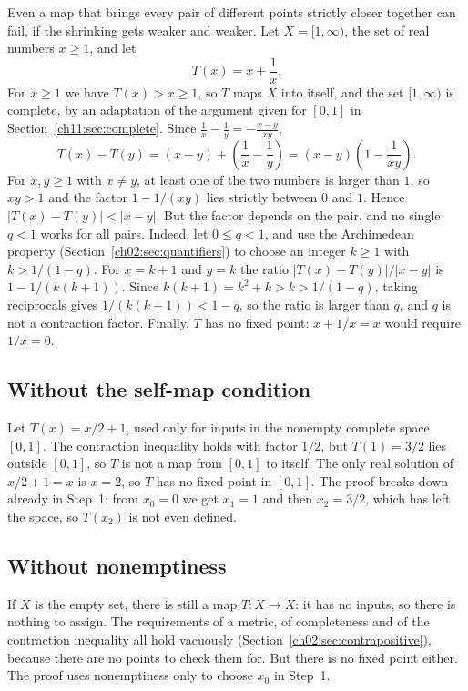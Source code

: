Even a map that brings every pair of different points strictly closer together can fail, if the shrinking gets weaker and weaker. Let $X=[1,\infty)$, the set of real numbers $x\ge1$, and let
\[
T(x)=x+\frac1x.
\]
For $x\ge1$ we have $T(x)>x\ge1$, so $T$ maps $X$ into itself, and the set $[1,\infty)$ is complete, by an adaptation of the argument given for $[0,1]$ in Section~\ref{ch11:sec:complete}. Since $\frac1x-\frac1y=-\frac{x-y}{xy}$,
\[
T(x)-T(y)=(x-y)+\left(\frac1x-\frac1y\right)=(x-y)\left(1-\frac1{xy}\right).
\]
For $x,y\ge1$ with $x\ne y$, at least one of the two numbers is larger than $1$, so $xy>1$ and the factor $1-1/(xy)$ lies strictly between $0$ and $1$. Hence $|T(x)-T(y)|<|x-y|$. But the factor depends on the pair, and no single $q<1$ works for all pairs. Indeed, let $0\le q<1$, and use the Archimedean property (Section~\ref{ch02:sec:quantifiers}) to choose an integer $k\ge1$ with $k>1/(1-q)$. For $x=k+1$ and $y=k$ the ratio $|T(x)-T(y)|/|x-y|$ is $1-1/(k(k+1))$. Since $k(k+1)=k^2+k>k>1/(1-q)$, taking reciprocals gives $1/(k(k+1))<1-q$, so the ratio is larger than $q$, and $q$ is not a contraction factor. Finally, $T$ has no fixed point: $x+1/x=x$ would require $1/x=0$.

\subsection*{Without the self-map condition}
Let $T(x)=x/2+1$, used only for inputs in the nonempty complete space $[0,1]$. The contraction inequality holds with factor $1/2$, but $T(1)=3/2$ lies outside $[0,1]$, so $T$ is not a map from $[0,1]$ to itself. The only real solution of $x/2+1=x$ is $x=2$, so $T$ has no fixed point in $[0,1]$. The proof breaks down already in Step~1: from $x_0=0$ we get $x_1=1$ and then $x_2=3/2$, which has left the space, so $T(x_2)$ is not even defined.

\subsection*{Without nonemptiness}
If $X$ is the empty set, there is still a map $T:X\to X$: it has no inputs, so there is nothing to assign. The requirements of a metric, of completeness and of the contraction inequality all hold vacuously (Section~\ref{ch02:sec:contrapositive}), because there are no points to check them for. But there is no fixed point either. The proof uses nonemptiness only to choose $x_0$ in Step~1.

